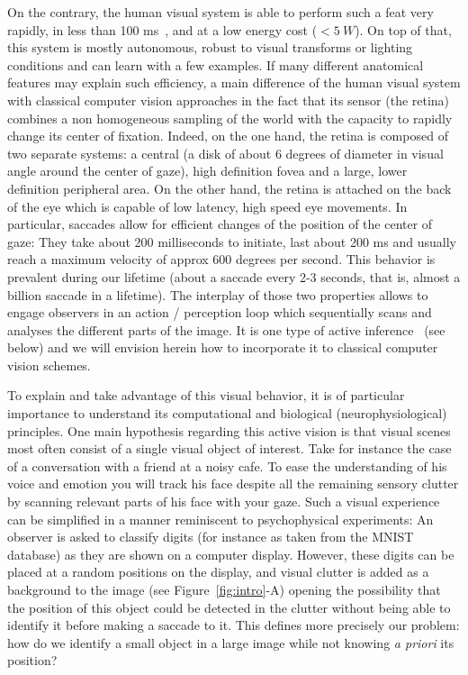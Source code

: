 \fi On the contrary, the human visual system is able to perform such a feat very rapidly, in less than 100 ms~\citep{Kirchner06}, and at a low energy cost ($<5~W$). On top of that, this system is mostly autonomous, robust to visual transforms or lighting conditions and can learn with a few examples. If many different anatomical features may explain such efficiency, a main difference of the human visual system with classical computer vision approaches in the fact that its sensor (the retina) combines a non homogeneous sampling of the world with the capacity to rapidly change its center of fixation. Indeed, on the one hand, the retina is composed of two separate systems: a central (a disk of about 6 degrees of diameter in visual angle around the center of gaze), high definition fovea and a large, lower definition peripheral area. On the other hand, the retina is attached on the back of the eye which is capable of low latency, high speed eye movements. In particular, saccades allow for efficient changes of the position of the center of gaze: They take about 200 milliseconds to initiate, last about 200 ms and usually reach a maximum velocity of approx 600 degrees per second. This behavior is prevalent during our lifetime (about a saccade every 2-3 seconds, that is, almost a billion saccade in a lifetime). The interplay of those two properties allows to engage observers in an action / perception loop which sequentially scans and analyses the different parts of the image. It is one type of active inference~\citep{Friston12} (see below) and we will envision herein how to incorporate it to classical computer vision schemes.

To explain and take advantage of this visual behavior, it is of particular importance to understand its computational and biological (neurophysiological) principles. One main hypothesis regarding this active vision is that visual scenes most often consist of a single visual object of interest. Take for instance the case of a conversation with a friend at a noisy cafe. To ease the understanding of his voice and emotion you will track his face despite all the remaining sensory clutter by scanning relevant parts of his face with your gaze. Such a visual experience can be simplified in a manner reminiscent to psychophysical experiments: An observer is asked to classify digits (for instance as taken from the MNIST database) as they are shown on a computer display. However, these digits can be placed at a random positions on the display, and visual clutter is added as a background to the image (see Figure~\ref{fig:intro}-A) opening the possibility that the position of this object could be detected in the clutter without being able to identify it before making a saccade to it. This defines more precisely our problem: how do we identify a small object in a large image while not knowing \emph{a priori} its position?

